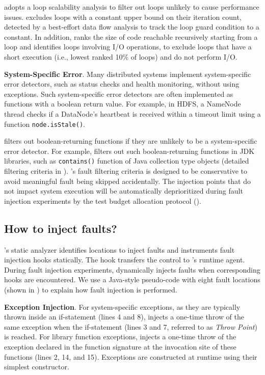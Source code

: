 \tool adopts a loop scalability analysis 
to filter out loops unlikely to cause performance issues. 
\tool excludes loops with a constant upper bound on their iteration count, detected by a best-effort data flow analysis to track the loop guard condition to a constant. 
In addition, 
\tool ranks the size of code reachable recursively starting from a loop 
and identifies loops involving I/O operations, 
to exclude loops that have a short execution (i.e., lowest ranked 10\% of loops) and do not perform I/O. 

\textbf{System-Specific Error}. 
Many distributed systems implement system-specific error detectors, 
such as status checks and health monitoring, 
without using exceptions. 
Such system-specific error detectors 
are often implemented as functions with a boolean return value. 
For example, in HDFS, a NameNode thread checks 
if a DataNode's heartbeat is received within a timeout limit 
using a function \texttt{node.isStale()}.

\tool filters out boolean-returning functions 
if they are unlikely to be a system-specific error detector. 
For example, 
\tool filters out such boolean-returning functions in JDK libraries, 
such as \texttt{contains()} function of Java collection type objects 
(detailed filtering criteria in ). 
\tool's fault filtering criteria 
is designed to be conservative
to avoid meaningful fault being skipped accidentally. 
The injection points that do not impact system execution will be automatically deprioritized during fault injection experiments 
by the test budget allocation protocol (). 


\subsection{How to inject faults?}
\label{sec:fia:how-to-inject}



\noindent
\tool's static analyzer 
identifies locations to inject faults 
and instruments fault injection hooks statically. 
The hook transfers the control to \tool's runtime agent. 
During fault injection experiments, 
\tool dynamically injects faults 
when corresponding hooks are encountered.  
We use 
a Java-style pseudo-code with eight fault locations
(shown in )
to explain how fault injection is performed. 




\textbf{Exception Injection}. 
For system-specific exceptions, 
as they are typically thrown inside an if-statement 
(lines 4 and 8), 
\tool injects 
a one-time throw of the same exception 
when the 
if-statement (lines 3 and 7, referred to as \textit{Throw Point}) is reached. 
For library function exceptions, 
\tool injects a one-time throw of the exception 
declared in the function signature 
at the invocation site of these functions 
(lines 2, 14, and 15). 
Exceptions are constructed at runtime 
using their simplest constructor.


